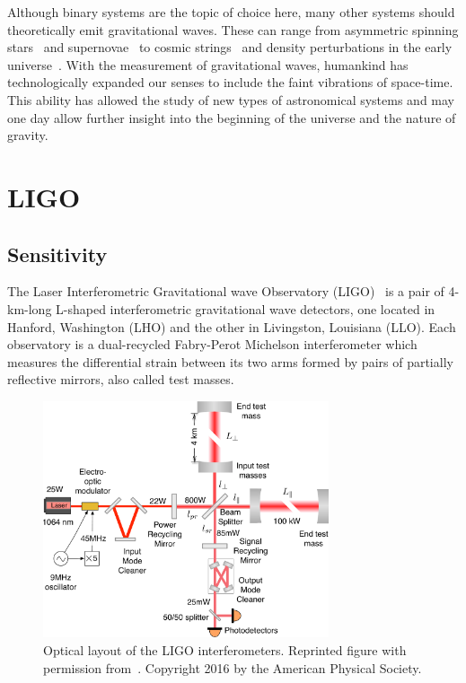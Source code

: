 \documentclass [12pt, proquest]{uwthesis}[2019]
\begin{document}
 Although binary systems are the topic of choice here, many other systems should theoretically emit gravitational waves. These can range from asymmetric spinning stars~\cite{contGW} and supernovae~\cite{SN} to cosmic strings~\cite{strings} and density perturbations in the early universe~\cite{inflation}. With the measurement of gravitational waves, humankind has technologically expanded our senses to include the faint vibrations of space-time. This ability has allowed the study of new types of astronomical systems and may one day allow further insight into the beginning of the universe and the nature of gravity.
\pagebreak
\section{LIGO}

\subsection{Sensitivity}

The Laser Interferometric Gravitational wave Observatory (LIGO)~\cite{aLIGO} is a pair of 4-km-long L-shaped interferometric gravitational wave detectors, one located in Hanford, Washington (LHO) and the other in Livingston, Louisiana (LLO). Each observatory is a dual-recycled Fabry-Perot Michelson interferometer which measures the differential strain between its two arms formed by pairs of partially reflective mirrors, also called test masses. 
\begin{figure}[!h]
\begin{center}
\includegraphics[width=0.75\textwidth]{LIGO_Schematic.pdf}
\caption[Optical layout of the LIGO interferometers]{Optical layout of the LIGO interferometers. Reprinted figure with permission from~\cite{LIGOSens}. Copyright 2016 by the American Physical Society.}
\label{LIGO_Schematic}
\end{center}
\end{figure}
\end{document}
